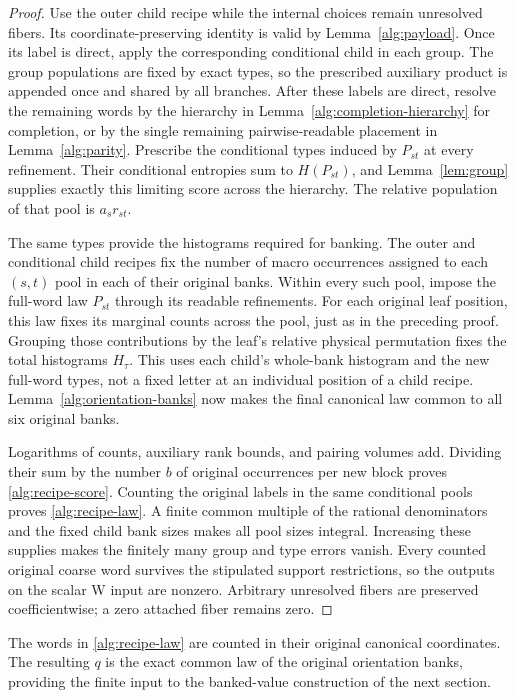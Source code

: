 \documentclass[11pt]{article}
\numberwithin{equation}{section}
\theoremstyle{definition}
\theoremstyle{remark}
\begin{document}
\begin{proof}
Use the outer child recipe while the internal choices remain unresolved
fibers.  Its coordinate-preserving identity is valid by
Lemma~\ref{alg:payload}.  Once its label is direct, apply the corresponding
conditional child in each group.  The group populations are fixed by exact
types, so the prescribed auxiliary product is appended once and shared by
all branches.  After these labels are direct, resolve the remaining words
by the hierarchy in Lemma~\ref{alg:completion-hierarchy} for completion,
or by the single remaining pairwise-readable placement in
Lemma~\ref{alg:parity}.  Prescribe the conditional types induced by
\(P_{st}\) at every refinement.  Their conditional entropies sum to
\(H(P_{st})\), and Lemma~\ref{lem:group} supplies exactly this limiting
score across the hierarchy.  The relative population of that pool is
\(a_sr_{st}\).

The same types provide the histograms required for banking.  The outer and
conditional child recipes fix the number of macro occurrences assigned to
each \((s,t)\) pool in each of their original banks.  Within every such
pool, impose the full-word law \(P_{st}\) through its readable refinements.
For each original leaf position, this law fixes its marginal counts across
the pool, just as in the preceding proof.  Grouping those contributions by
the leaf's relative physical permutation fixes the total histograms
\(H_\tau\).  This uses each child's whole-bank histogram and the new
full-word types, not a fixed letter at an individual position of a child
recipe.  Lemma~\ref{alg:orientation-banks} now makes the final canonical
law common to all six original banks.

Logarithms of counts, auxiliary rank bounds, and pairing volumes add.
Dividing their sum by the number \(b\) of original occurrences per new
block proves \eqref{alg:recipe-score}.  Counting the original labels in
the same conditional pools proves \eqref{alg:recipe-law}.  A finite common
multiple of the rational denominators and the fixed child bank sizes
makes all pool sizes integral.  Increasing these supplies makes the finitely
many group and type errors vanish.  Every counted original coarse word
survives the stipulated support restrictions, so the outputs on the scalar
W input are nonzero.  Arbitrary unresolved fibers are preserved
coefficientwise; a zero attached fiber remains zero.
\end{proof}

The words in \eqref{alg:recipe-law} are counted in their original canonical
coordinates.  The resulting \(q\) is the exact common law of the original
orientation banks, providing the finite input to the banked-value
construction of the next section.
\end{document}

